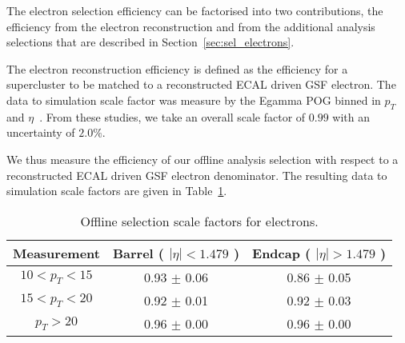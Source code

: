 
The electron selection efficiency can be factorised into two contributions,
the efficiency from the electron reconstruction and from the additional
analysis selections that are described in Section~\ref{sec:sel_electrons}.

The electron reconstruction efficiency is defined as the efficiency for a
supercluster to be matched to a reconstructed ECAL driven GSF electron.
The data to simulation scale factor was measure by the Egamma POG binned in
$p_T$ and $\eta$~\cite{ref:egamma_eff_gsf}. From these studies, we take an overall scale factor of
$0.99$ with an uncertainty of $2.0\%$.

We thus measure the efficiency of our offline analysis selection 
with respect to a reconstructed ECAL driven GSF electron denominator. 
The resulting data to simulation scale factors are given in Table~\ref{tab:eff_ele_offline}.


\begin{table}[!ht]
\begin{center}
\begin{tabular}{c|c|c}
\hline
Measurement & Barrel ( $|\eta|<1.479$ )   & Endcap ( $|\eta|>1.479$ )  \\ 
\hline
$  10<p_T<  15$ & 0.93 $\pm$ 0.06  & 0.86 $\pm$ 0.05  \\ \hline 
$  15<p_T<  20$ & 0.92 $\pm$ 0.01  & 0.92 $\pm$ 0.03  \\ \hline 
$  p_T>     20$ & 0.96 $\pm$ 0.00  & 0.96 $\pm$ 0.00  \\ \hline 
\end{tabular}
\caption{Offline selection scale factors for electrons.}
\label{tab:eff_ele_offline}
\end{center}
\end{table}

